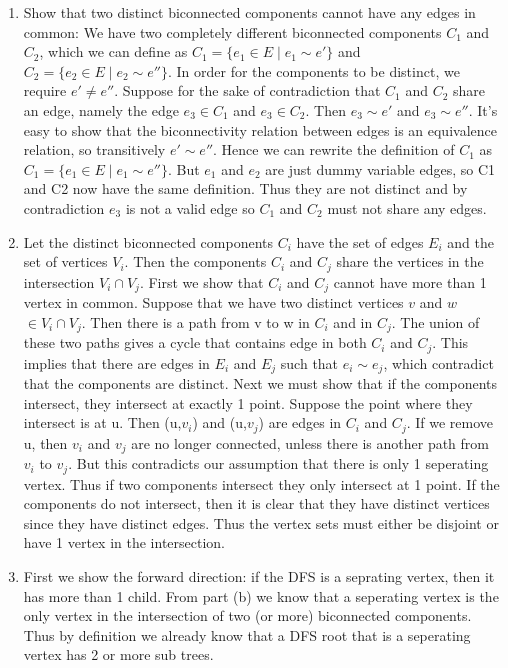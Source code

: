 \documentclass[11pt]{article}
\newenvironment{qparts}{\begin{enumerate}[{(}a{)}]}{\end{enumerate}}
\begin{document}
\begin{qparts}
\item Show that two distinct biconnected components cannot have any edges in common: We have two completely different biconnected components $C_1$ and $C_2$, which we can define as $C_1 = \{e_1 \in E \mid e_1 \sim e'\}$ and $C_2 = \{e_2 \in E \mid e_2 \sim e''\}$. In order for the components to be distinct, we require $e' \neq e''$. Suppose for the sake of contradiction that $C_1$ and $C_2$ share an edge, namely the edge $e_3 \in C_1$ and $e_3 \in C_2$. Then $e_3 \sim e'$ and $e_3 \sim e''$. It's easy to show that the biconnectivity relation between edges is an equivalence relation, so transitively $e' \sim e''$. Hence we can rewrite the definition of $C_1$ as $C_1 = \{e_1 \in E \mid e_1 \sim e''\}$. But $e_1$ and $e_2$ are just dummy variable edges, so C1 and C2 now have the same definition. Thus they are not distinct and by contradiction $e_3$ is not a valid edge so $C_1$ and $C_2$ must not share any edges.
\item Let the distinct biconnected components $C_i$ have the set of edges $E_i$ and the set of vertices $V_i$. Then the components $C_i$ and $C_j$ share the vertices in the intersection $V_i \cap V_j$. First we show that $C_i$ and $C_j$ cannot have more than 1 vertex in common. Suppose that we have two distinct vertices $v$ and $w$ $\in V_i \cap V_j$. Then there is a path from v to w in $C_i$ and in $C_j$. The union of these two paths gives a cycle that contains edge in both $C_i$ and $C_j$. This implies that there are edges in $E_i$ and $E_j$ such that $e_i \sim e_j$, which contradict that the components are distinct.
Next we must show that if the components intersect, they intersect at exactly 1 point. Suppose the point where they intersect is at u. Then (u,$v_i$) and (u,$v_j$) are edges in $C_i$ and $C_j$. If we remove u, then $v_i$ and $v_j$ are no longer connected, unless there is another path from $v_i$ to $v_j$. But this contradicts our assumption that there is only 1 seperating vertex. Thus if two components intersect they only intersect at 1 point.
If the components do not intersect, then it is clear that they have distinct vertices since they have distinct edges. Thus the vertex sets must either be disjoint or have 1 vertex in the intersection.
\item First we show the forward direction: if the DFS is a seprating vertex, then it has more than 1 child. From part (b) we know that a seperating vertex is the only vertex in the intersection of two (or more) biconnected components. Thus by definition we already know that a DFS root that is a seperating vertex has 2 or more sub trees. \newline

\end{qparts}
\end{document}
